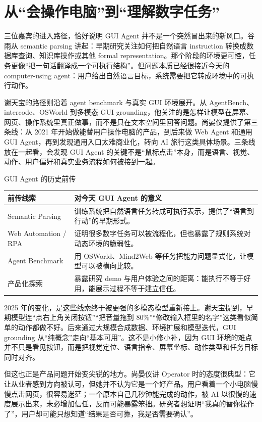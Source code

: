 \section{从“会操作电脑”到“理解数字任务”}

三位嘉宾的进入路径，恰好说明 GUI Agent 并不是一个突然冒出来的新风口。谷雨从 semantic parsing 讲起：早期研究关注如何把自然语言 instruction 转换成数据库查询、知识库操作或其他 formal representation。那个阶段的环境更可控，任务更像“把一句话翻译成一个可执行结构”。但问题本质已经很接近今天的 computer-using agent：用户给出自然语言目标，系统需要把它转成环境中的可执行动作。

谢天宝的路径则沿着 agent benchmark 与真实 GUI 环境展开。从 AgentBench、intercode、OSWorld 到多模态 GUI grounding，他关注的是怎样让模型在屏幕、网页、操作系统里真正做事，而不是只在文本空间里回答问题。尚晏仪提供了第三条线：从 2021 年开始做能替用户操作电脑的产品，到后来做 Web Agent 和通用 GUI Agent，再到发现通用入口太难商业化，转向 AI 旅行这类具体场景。三条线放在一起看，会发现 GUI Agent 的关键不是“鼠标点击”本身，而是语言、视觉、动作、用户偏好和真实业务流程如何被接到一起。

\begin{knowledgebox}{GUI Agent 的历史前传}
\begin{tabularx}{\textwidth}{>{\raggedright\arraybackslash}p{} Y}
\toprule
前传线索 & 对今天 GUI Agent 的意义 \\
\midrule
Semantic Parsing & 训练系统把自然语言任务转成可执行表示，提供了“语言到行动”的早期形式。 \\
Web Automation / RPA & 证明很多数字任务可以被流程化，但也暴露了规则系统对动态环境的脆弱性。 \\
Agent Benchmark & 用 OSWorld、Mind2Web 等任务把能力问题显式化，让模型可以被横向比较。 \\
产品化探索 & 暴露研究 demo 与用户体验之间的距离：能执行不等于好用，能展示过程不等于建立信任。 \\
\bottomrule
\end{tabularx}
\end{knowledgebox}

2025 年的变化，是这些线索终于被更强的多模态模型重新接上。谢天宝提到，早期模型连“点右上角关闭按钮”“把音量拖到 80\%”“修改输入框里的名字”这类看似简单的动作都做不好。后来通过大规模合成数据、环境扩展和模型迭代，GUI grounding 从“纯概念”走向“基本可用”。这不是小修小补，因为 GUI 环境的难点并不只是看见按钮，而是把视觉定位、语言指令、屏幕坐标、动作类型和任务目标同时对齐。

但这也正是产品问题开始变尖锐的地方。尚晏仪讲 Operator 时的态度很典型：它让从业者感到方向被认可，但她并不认为它是一个好产品。用户看着一个小电脑慢慢点击网页，很容易迷茫；一个原本自己几秒钟能完成的动作，被 AI 以很慢的速度展示出来，未必增加信任，反而可能暴露笨拙。研究者想证明“我真的替你操作了”，用户却可能只想知道“结果是否可靠，我是否需要确认”。


